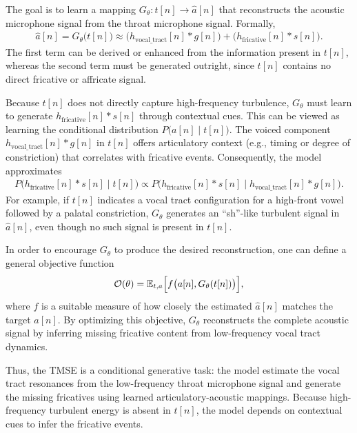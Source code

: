 \documentclass[10pt]{wlscirep}
\begin{document}
The goal is to learn a mapping \(G_\theta: t[n] \rightarrow \hat{a}[n]\) that reconstructs the acoustic microphone signal from the throat microphone signal. Formally,  
\begin{align}
    \hat{a}[n] = G_\theta\bigl(t[n]\bigr) 
            \approx 
            \bigl(h_{\text{vocal\_tract}}[n] \ast g[n]\bigr) 
            + 
            \bigl(h_{\text{fricative}}[n] \ast s[n]\bigr).
\end{align}
The first term can be derived or enhanced from the information present in \(t[n]\), whereas the second term must be generated outright, since \(t[n]\) contains no direct fricative or affricate signal.

Because \(t[n]\) does not directly capture high-frequency turbulence, \(G_\theta\) must learn to generate \(h_{\text{fricative}}[n] \ast s[n]\) through contextual cues. This can be viewed as learning the conditional distribution \(P\bigl(a[n] \mid t[n]\bigr)\). The voiced component \(h_{\text{vocal\_tract}}[n] \ast g[n]\) in \(t[n]\) offers articulatory context (e.g., timing or degree of constriction) that correlates with fricative events. Consequently, the model approximates  
\begin{align}
    P\bigl(h_{\text{fricative}}[n] \ast s[n] 
       \mid 
       t[n]\bigr) 
\propto 
P\bigl(h_{\text{fricative}}[n] \ast s[n] 
       \mid 
       h_{\text{vocal\_tract}}[n] \ast g[n]\bigr).
\end{align}
For example, if \(t[n]\) indicates a vocal tract configuration for a high-front vowel followed by a palatal constriction, \(G_\theta\) generates an “sh”-like turbulent signal in \(\hat{a}[n]\), even though no such signal is present in \(t[n]\).

In order to encourage \(G_\theta\) to produce the desired reconstruction, one can define a general objective function  
\begin{align}
    \mathcal{O}(\theta) 
= 
\mathbb{E}_{t,a} 
  \Bigl[ 
    f\bigl(a[n], G_\theta(t[n])\bigr) 
  \Bigr],
\end{align}
where \(f\) is a suitable measure of how closely the estimated \(\hat{a}[n]\) matches the target \(a[n]\). By optimizing this objective, \(G_\theta\) reconstructs the complete acoustic signal by inferring missing fricative content from low-frequency vocal tract dynamics.

Thus, the TMSE is a conditional generative task: the model estimate the vocal tract resonances from the low-frequency throat microphone signal and generate the missing fricatives using learned articulatory-acoustic mappings. Because high-frequency turbulent energy is absent in \(t[n]\), the model depends on contextual cues to infer the fricative events.
\end{document}
